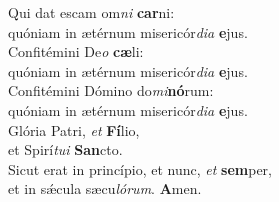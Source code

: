 \oddverse Qui dat escam om\textit{ni} \textbf{car}ni:~\*\\
\oddverse quóniam in ætérnum misericór\textit{di}\textit{a} \textbf{e}jus.\\
\evenverse Confitémini De\textit{o} \textbf{cæ}li:~\*\\
\evenverse quóniam in ætérnum misericór\textit{di}\textit{a} \textbf{e}jus.\\
\oddverse Confitémini Dómino do\textit{mi}\textbf{nó}rum:~\*\\
\oddverse quóniam in ætérnum misericór\textit{di}\textit{a} \textbf{e}jus.\\
\evenverse Glória Patri, \textit{et} \textbf{Fí}lio,~\*\\
\evenverse et Spirí\textit{tu}\textit{i} \textbf{San}cto.\\
\oddverse Sicut erat in princípio, et nunc, \textit{et} \textbf{sem}per,~\*\\
\oddverse et in sǽcula sæcu\textit{ló}\textit{rum}. \textbf{A}men.\\
